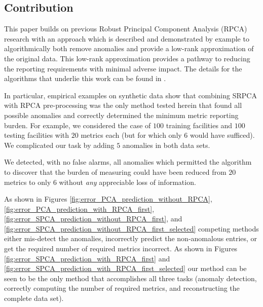 \documentclass[conference]{IEEEtran}
\begin{document}
\subsection{Contribution}
This paper builds on previous Robust Principal Component Analysis (RPCA) research with an approach which is described and demonstrated by example to algorithmically  both remove anomalies and provide a low-rank approximation of the original data.  This low-rank approximation provides a pathway to reducing the reporting requirements with minimal adverse impact.  The details for the algorithms that underlie this work can be found in \cite{paffenroth2018robust,Paffenroth2012}.

In particular, empirical examples on synthetic data show that combining SRPCA with RPCA pre-processing was the only method tested herein that found all possible anomalies 
and correctly determined the minimum metric reporting burden. For example, we considered the case of $100$ training facilities and $100$ testing facilities with $20$ metrics each (but for which only $6$ would have sufficed). We complicated our task by adding $5$ anomalies in both  data sets.  

We detected, with no false alarms, all anomalies which permitted the algorithm to discover that the burden of measuring could have been reduced from $20$ metrics to only $6$ without \emph{any} appreciable loss of information.  

As shown in Figures \ref{fig:error_PCA_prediction_without_RPCA}, \ref{fig:error_PCA_prediction_with_RPCA_first}, \ref{fig:error_SPCA_prediction_without_RPCA_first}, and \ref{fig:error_SPCA_prediction_without_RPCA_first_selected} competing methods either mis-detect the anomalies, incorrectly predict the non-anomalous entries, or get the required number of required metrics incorrect.
As shown in Figures \ref{fig:error_SPCA_prediction_with_RPCA_first} and \ref{fig:error_SPCA_prediction_with_RPCA_first_selected} our method can be seen to be the only method that accomplishes all three tasks (anomaly detection, correctly computing the number of required metrics, and reconstructing the complete data set).
\end{document}
